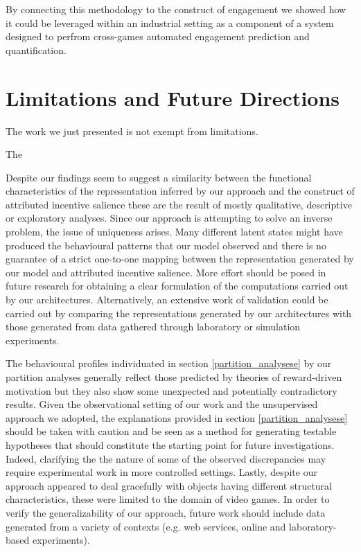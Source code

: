 By connecting this methodology to the construct of engagement we showed how it could be leveraged within an industrial setting as a component of a system designed to perfrom cross-games automated engagement prediction and quantification.

\section{Limitations and Future Directions}
\label{discussion_limitations}
The work we just presented is not exempt from limitations. 

The 

Despite our findings seem to suggest a similarity between the functional characteristics of the representation inferred by our approach and the construct of attributed incentive salience these are the result of mostly qualitative, descriptive or exploratory analyses. 
Since our approach is attempting to solve an inverse problem, the issue of uniqueness arises. Many different latent states might have produced the behavioural patterns that our model observed and there is no guarantee of a strict one-to-one mapping between the representation generated by our model and attributed incentive salience.  More effort should be posed in future research for obtaining a clear formulation of the computations carried out by our architectures. Alternatively, an extensive work of validation could be carried out by comparing the representations generated by our architectures with those generated from data gathered through laboratory or simulation experiments. 

The behavioural profiles individuated in section \ref{partition_analysese} by our partition analyses generally reflect those predicted by theories of reward-driven motivation \citep{thorndike1927law,skinner1965science,berridge2004motivation} but they also show some unexpected and potentially contradictory results. Given the observational setting of our work and the unsupervised approach we adopted, the explanations provided in section \ref{partition_analysese} should be taken with caution and be seen as a method for generating testable hypotheses that should constitute the starting point for future investigations. Indeed, clarifying the the nature of some of the observed discrepancies may require experimental work in more controlled settings. Lastly, despite our approach appeared to deal gracefully with objects having different structural characteristics, these were limited to the domain of video games. In order to verify the generalizability of our approach, future work should include data generated from a variety of contexts (e.g. web services, online and laboratory-based experiments).  


